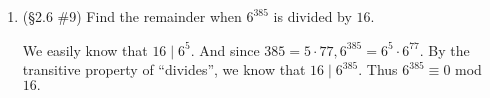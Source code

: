 \documentclass[11pt,a4paper]{article}
\begin{document}
\begin{enumerate}
\begin{proof}
		Sorry, I cannot solve this problem :(
	\end{proof}

	\item (\S 2.6 \#9) Find the remainder when \(6^{385}\) is divided by \(16\).

	We easily know that $16 \mid 6^5.$ And since $385=5\cdot 77, 6^{385}=6^5\cdot 6^{77}.$ By the transitive property of ``divides'', we know that $16 \mid 6^{385}.$ Thus $6^{385} \equiv 0$ mod $16.$




\end{enumerate}
\end{document}
